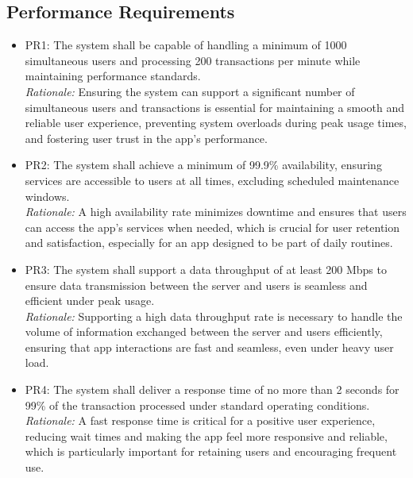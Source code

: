 \documentclass[12pt]{article}
\begin{document}
\subsection{Performance Requirements}
\begin{itemize}
\item PR1: The system shall be capable of handling a minimum of 1000 simultaneous users and processing 200 transactions per minute while maintaining performance standards.\\
\textit{Rationale:} Ensuring the system can support a significant number of simultaneous users and transactions is essential for maintaining a smooth and reliable user experience, preventing system overloads during peak usage times, and fostering user trust in the app’s performance.
\item PR2: The system shall achieve a minimum of 99.9\% availability, ensuring services are accessible to users at all times, excluding scheduled maintenance windows.\\
\textit{Rationale:} A high availability rate minimizes downtime and ensures that users can access the app’s services when needed, which is crucial for user retention and satisfaction, especially for an app designed to be part of daily routines.
\item PR3: The system shall support a data throughput of at least 200 Mbps to ensure data transmission between the server and users is seamless and efficient under peak usage.\\
\textit{Rationale:} Supporting a high data throughput rate is necessary to handle the volume of information exchanged between the server and users efficiently, ensuring that app interactions are fast and seamless, even under heavy user load.
\item PR4: The system shall deliver a response time of no more than 2 seconds for 99\% of the transaction processed under standard operating conditions.\\
\textit{Rationale:} A fast response time is critical for a positive user experience, reducing wait times and making the app feel more responsive and reliable, which is particularly important for retaining users and encouraging frequent use.
\end{itemize}
\end{document}
